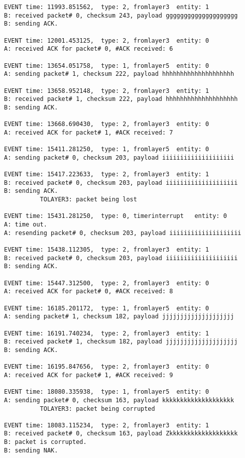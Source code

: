 \documentclass[12pt]{article}
\begin{document}
\begin{Verbatim}[frame=single, rulecolor=\color{cyan}, label=10 messages ACKed correctly]
EVENT time: 11993.851562,  type: 2, fromlayer3  entity: 1
B: received packet# 0, checksum 243, payload gggggggggggggggggggg
B: sending ACK.

EVENT time: 12001.453125,  type: 2, fromlayer3  entity: 0
A: received ACK for packet# 0, #ACK received: 6

EVENT time: 13654.051758,  type: 1, fromlayer5  entity: 0
A: sending packet# 1, checksum 222, payload hhhhhhhhhhhhhhhhhhhh

EVENT time: 13658.952148,  type: 2, fromlayer3  entity: 1
B: received packet# 1, checksum 222, payload hhhhhhhhhhhhhhhhhhhh
B: sending ACK.

EVENT time: 13668.690430,  type: 2, fromlayer3  entity: 0
A: received ACK for packet# 1, #ACK received: 7

EVENT time: 15411.281250,  type: 1, fromlayer5  entity: 0
A: sending packet# 0, checksum 203, payload iiiiiiiiiiiiiiiiiiii

EVENT time: 15417.223633,  type: 2, fromlayer3  entity: 1
B: received packet# 0, checksum 203, payload iiiiiiiiiiiiiiiiiiii
B: sending ACK.
          TOLAYER3: packet being lost

EVENT time: 15431.281250,  type: 0, timerinterrupt   entity: 0
A: time out. 
A: resending packet# 0, checksum 203, payload iiiiiiiiiiiiiiiiiiii

EVENT time: 15438.112305,  type: 2, fromlayer3  entity: 1
B: received packet# 0, checksum 203, payload iiiiiiiiiiiiiiiiiiii
B: sending ACK.

EVENT time: 15447.312500,  type: 2, fromlayer3  entity: 0
A: received ACK for packet# 0, #ACK received: 8

EVENT time: 16185.201172,  type: 1, fromlayer5  entity: 0
A: sending packet# 1, checksum 182, payload jjjjjjjjjjjjjjjjjjjj

EVENT time: 16191.740234,  type: 2, fromlayer3  entity: 1
B: received packet# 1, checksum 182, payload jjjjjjjjjjjjjjjjjjjj
B: sending ACK.

EVENT time: 16195.847656,  type: 2, fromlayer3  entity: 0
A: received ACK for packet# 1, #ACK received: 9

EVENT time: 18080.335938,  type: 1, fromlayer5  entity: 0
A: sending packet# 0, checksum 163, payload kkkkkkkkkkkkkkkkkkkk
          TOLAYER3: packet being corrupted

EVENT time: 18083.115234,  type: 2, fromlayer3  entity: 1
B: received packet# 0, checksum 163, payload Zkkkkkkkkkkkkkkkkkkk
B: packet is corrupted.
B: sending NAK.


\end{Verbatim}
\end{document}
